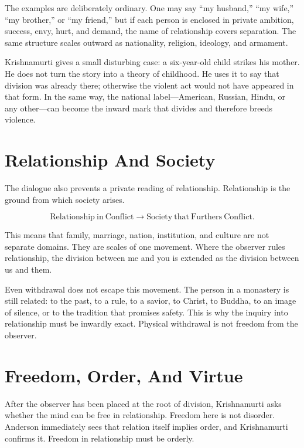 \documentclass[11pt,oneside]{book}
\begin{document}
The examples are deliberately ordinary. One may say ``my husband,'' ``my wife,'' ``my brother,'' or ``my friend,'' but if each person is enclosed in private ambition, success, envy, hurt, and demand, the name of relationship covers separation. The same structure scales outward as nationality, religion, ideology, and armament.

Krishnamurti gives a small disturbing case: a six-year-old child strikes his mother. He does not turn the story into a theory of childhood. He uses it to say that division was already there; otherwise the violent act would not have appeared in that form. In the same way, the national label---American, Russian, Hindu, or any other---can become the inward mark that divides and therefore breeds violence.

\section{Relationship And Society}

The dialogue also prevents a private reading of relationship. Relationship is the ground from which society arises.

\begin{equation}
\mathrm{Relationship\ in\ Conflict}
\longrightarrow
\mathrm{Society\ that\ Furthers\ Conflict}.
\end{equation}

This means that family, marriage, nation, institution, and culture are not separate domains. They are scales of one movement. Where the observer rules relationship, the division between me and you is extended as the division between us and them.

Even withdrawal does not escape this movement. The person in a monastery is still related: to the past, to a rule, to a savior, to Christ, to Buddha, to an image of silence, or to the tradition that promises safety. This is why the inquiry into relationship must be inwardly exact. Physical withdrawal is not freedom from the observer.

\section{Freedom, Order, And Virtue}

After the observer has been placed at the root of division, Krishnamurti asks whether the mind can be free in relationship. Freedom here is not disorder. Anderson immediately sees that relation itself implies order, and Krishnamurti confirms it. Freedom in relationship must be orderly.
\end{document}
